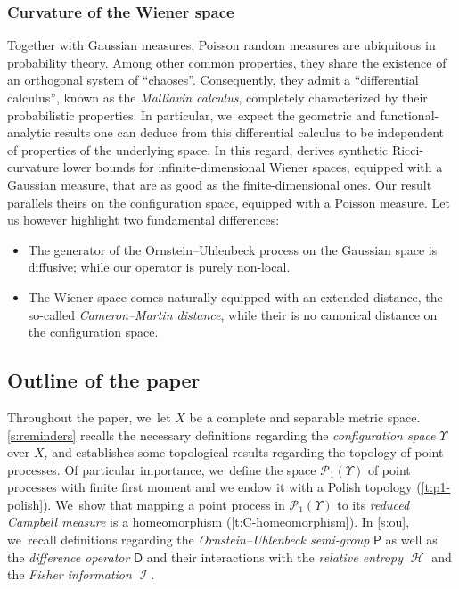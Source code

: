 \documentclass[JEP,XML,SOM,Unicode,published]{cedram}
\theoremstyle{definition}
\theoremstyle{remark}
\DeclareMathOperator{\ent}{\mathcal{H}}
\DeclareMathOperator{\fish}{\mathcal{I}}
\begin{document}
\subsubsection{Curvature of the Wiener space}
Together with Gaussian measures, Poisson random measures are ubiquitous in probability theory.
Among other common properties, they share the existence of an orthogonal system of \enquote{chaoses}.
Consequently, they admit a \enquote{differential calculus}, known as the \emph{Malliavin calculus}, completely characterized by their probabilistic properties.
In particular, we~expect the geometric and functional-analytic results one can deduce from this differential calculus to be independent of properties of the underlying space.
In this regard, \cite{FangShaoSturm} derives synthetic Ricci-curvature lower bounds for infinite-dimensional Wiener spaces, equipped with a Gaussian measure, that are as good as the finite-dimensional ones.
Our result parallels theirs on the configuration space, equipped with a Poisson measure.
Let us however highlight two fundamental differences:
\begin{itemize}[wide]
\item The generator of the Ornstein--Uhlenbeck process on the Gaussian space is diffusive; while our operator is purely non-local.
\item The Wiener space comes naturally equipped with an extended distance, the so-called \emph{Cameron--Martin distance}, while their is no canonical distance on the configuration space.
\end{itemize}

\subsection{Outline of the paper}
Throughout the paper, we~let $X$ be a complete and separable metric space.
\cref{s:reminders} recalls the necessary definitions regarding the \emph{configuration space} $\varUpsilon$ over $X$, and establishes some topological results regarding the topology of point processes.
Of particular importance, we~define the space $\mathscr{P}_{1}(\varUpsilon)$ of point processes with finite first moment and we endow it with a Polish topology (\cref{t:p1-polish}). We~show that mapping a point process in $\mathscr{P}_{1}(\varUpsilon)$ to its \emph{reduced Campbell measure} is a homeomorphism (\cref{t:C-homeomorphism}).
In \cref{s:ou}, we~recall definitions regard\-ing the \emph{Ornstein--Uhlenbeck semi-group} $\mathsf{P}$ as well as the \emph{difference operator} $\mathsf{D}$ and their interactions with the \emph{relative entropy $\ent$} and the \emph{Fisher information $\fish$}.
\end{document}
